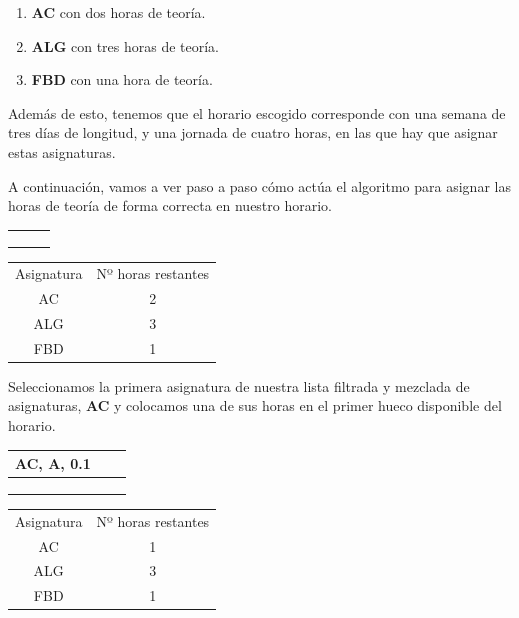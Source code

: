 \begin{enumerate}[$\bullet$]
    \item \textbf{AC} con dos horas de teoría.
    \item \textbf{ALG} con tres horas de teoría.
    \item \textbf{FBD} con una hora de teoría.
\end{enumerate}

Además de esto, tenemos que el horario escogido corresponde con una semana de tres días de longitud, y una jornada de cuatro horas, en las que hay que asignar estas asignaturas.



A continuación, vamos a ver paso a paso cómo actúa el algoritmo para asignar las horas de teoría de forma correcta en nuestro horario.

\begin{minipage}{0.5\textwidth}    
\begin{tabular}{| c | c | c |}
\hline
 &  &  \\
 \hline
 &  &  \\
 \hline
 &  &  \\
 \hline
 &  &  \\
 \hline 
\end{tabular}
\end{minipage}
\begin{minipage}{0.5\textwidth}
\begin{tabular}{c | c}
Asignatura & Nº horas restantes \\
AC & 2 \\
ALG & 3 \\
FBD & 1
\end{tabular}
\end{minipage}

Seleccionamos la primera asignatura de nuestra lista filtrada y mezclada de asignaturas, \textbf{AC} y colocamos una de sus horas en el primer hueco disponible del horario. 

\begin{minipage}{0.5\textwidth}    
\begin{tabular}{| c | c | c |}
\hline
AC, A, 0.1 &  &  \\
 \hline
 &  &  \\
 \hline
 &  &  \\
 \hline
 &  &  \\
 \hline 
\end{tabular}
\end{minipage}
\begin{minipage}{0.5\textwidth}
\begin{tabular}{c | c}
Asignatura & Nº horas restantes \\
AC & 1 \\
ALG & 3 \\
FBD & 1
\end{tabular}
\end{minipage}

